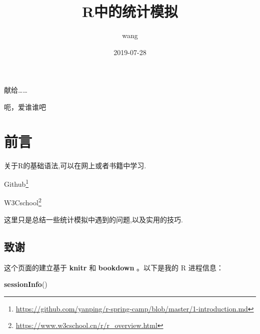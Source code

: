 \documentclass[]{ctexbook}
\title{R中的统计模拟}
\author{wang}
\date{2019-07-28}
\newenvironment{Shaded}{\begin{snugshade}}{\end{snugshade}}
\newcommand{\KeywordTok}[1]{\textcolor[rgb]{0.13,0.29,0.53}{\textbf{#1}}}
\newcommand{\NormalTok}[1]{#1}
\renewcommand{\href}[2]{#2\footnote{\url{#1}}}
\begin{document}
\maketitle


\thispagestyle{empty}

\begin{center}
献给……

呃，爱谁谁吧
\end{center}

\setlength{\abovedisplayskip}{-5pt}
\setlength{\abovedisplayshortskip}{-5pt}

{
\setcounter{tocdepth}{2}
\tableofcontents
}
\listoftables
\listoffigures
\hypertarget{section}{%
\chapter*{前言}\label{section}}


关于R的基础语法,可以在网上或者书籍中学习.

\href{https://github.com/yanping/r-spring-camp/blob/master/1-introduction.md}{Github}

\href{https://www.w3cschool.cn/r/r_overview.html}{W3Cschool}

这里只是总结一些统计模拟中遇到的问题,以及实用的技巧.

\hypertarget{section-1}{%
\section*{致谢}\label{section-1}}


这个页面的建立基于 \textbf{knitr} \citep{xie2015}和 \textbf{bookdown} \citep{R-bookdown}。以下是我的 R 进程信息：

\begin{Shaded}
\begin{Highlighting}[]
\KeywordTok{sessionInfo}\NormalTok{()}
\end{Highlighting}
\end{Shaded}
\end{document}
